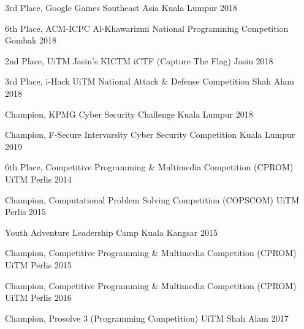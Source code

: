 \begin{cvhonors}
  \cvhonor
    {3rd Place,}
    {Google Games Southeast Asia}
    {Kuala Lumpur}
    {2018}

  \cvhonor
    {6th Place,}
    {ACM-ICPC Al-Khawarizmi National Programming Competition}
    {Gombak}
    {2018}

  \cvhonor
    {2nd Place,}
    {UiTM Jasin's KICTM iCTF (Capture The Flag) }
    {Jasin}
    {2018}

  \cvhonor
    {3rd Place,}
    {i-Hack UiTM National Attack \& Defense Competition}
    {Shah Alam}
    {2018}

  \cvhonor
    {Champion,}
    {KPMG Cyber Security Challenge}
    {Kuala Lumpur}
    {2018}

  \cvhonor
  {Champion,}
  {F-Secure Intervarsity Cyber Security Competition}
  {Kuala Lumpur}
  {2019}

\end{cvhonors}


\begin{cvhonors}

  \cvhonor
    {6th Place,}
    {Competitive Programming \& Multimedia Competition (CPROM)}
    {UiTM Perlis}
    {2014}

  \cvhonor
    {Champion,}
    {Computational Problem Solving Competition (COPSCOM)}
    {UiTM Perlis}
    {2015}

  \cvhonor
    {}
    {Youth Adventure Leadership Camp}
    {Kuala Kangsar}
    {2015}

  \cvhonor
    {Champion,}
    {Competitive Programming \& Multimedia Competition (CPROM)}
    {UiTM Perlis}
    {2015}
        
  \cvhonor
    {Champion,}
    {Competitive Programming \& Multimedia Competition (CPROM)}
    {UiTM Perlis}
    {2016}

  \cvhonor
    {Champion,}
    {Prosolve 3 (Programming Competition)}
    {UiTM Shah Alam}
    {2017}

\end{cvhonors}
